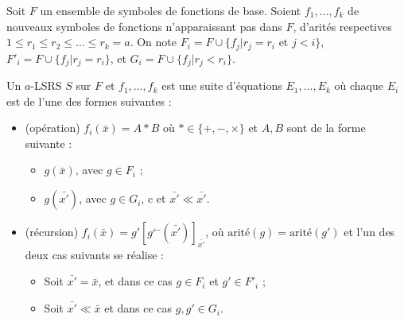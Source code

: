 \documentclass{report}
\newcommand{\eqpred}[3]{#1\left[ #2^{\leftarrow}(#3) \right]_{#3}}
\begin{document}
		\begin{definition}[$a$-LSRS]
			\label{def:aLSRS}
			Soit $F$ un ensemble de symboles de fonctions de base. Soient $f_1, \dots, f_k$ de nouveaux symboles de fonctions n'apparaissant pas dans $F$, d'arités respectives $1 \leqslant r_1 \leqslant r_2 \leqslant \dots \leqslant r_k = a$\footnotemark. 			
			On note $F_i = F \cup \{f_j | r_j = r_i \text{ et } j < i\}$, $F'_i = F \cup \{f_j | r_j = r_i\}$, et $G_i = F \cup \{ f_j | r_j < r_i\}$\footnotemark.
			
				
			Un $a$-LSRS $S$ sur $F$ et $f_1, \dots, f_k$ est une suite d'équations $E_1, \dots, E_k$ où chaque $E_i$ est de l'une des formes suivantes :
			
			\begin{itemize}[itemsep=-1mm]
				\item	(opération) 	$f_i\left(\bar{x}\right) = A * B$ où $* \in \{+,-,\times\}$ et $A, B$ sont de la forme suivante : 
						\begin{itemize}[itemsep=-1mm]
							\item 	$g\left(\bar{x}\right)$, avec $g \in F_i$ ;
							\item 	$g\left(\bar{x'}\right)$, avec $g \in G_i$, c et $\bar{x'} \ll \bar{x'}$.
						\end{itemize}
									
				\item 	(récursion)		$f_i\left(\bar{x}\right) = \eqpred{g'}{g}{\bar{x'}}$, où $\text{arité}(g) = \text{arité}(g')$ et l'un des deux cas suivants se réalise :
						\begin{itemize}[itemsep=-1mm]
							\item 	Soit $\bar{x'} = \bar{x}$, et dans ce cas $g \in F_i$ et $g' \in F'_i$ ;
							\item 	Soit $\bar{x'} \ll \bar{x}$ et dans ce cas $g, g' \in G_i$. 
						\end{itemize}
						

\end{itemize}
\end{definition}
\end{document}
